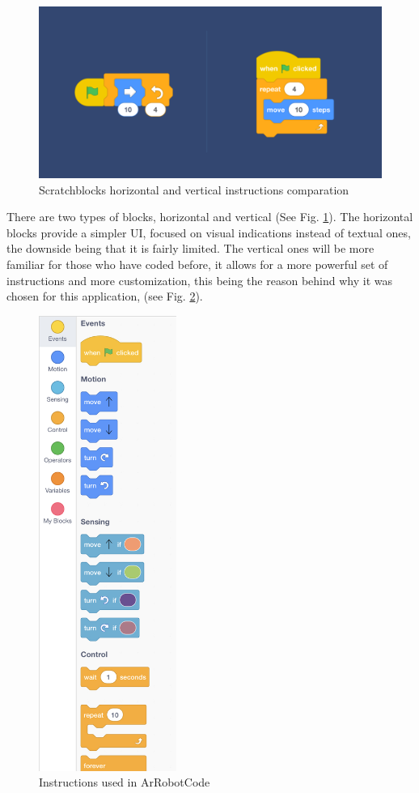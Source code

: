 \documentclass[12 pct]{report}
\begin{document}
\begin{figure}[H]
\includegraphics[width=1.0\textwidth]{scratchblocks}
\centering
\caption{Scratchblocks horizontal and vertical instructions comparation}
\label{fig:scratch-blocks}
\end{figure}

There are two types of blocks, horizontal and vertical (See Fig. \ref{fig:scratch-blocks}). 
The horizontal blocks provide a simpler UI, focused on visual indications instead of textual ones, the downside being that it is fairly limited. 
The vertical ones will be more familiar for those who have coded before, it allows for a more powerful set of instructions and more customization, this being the reason behind why it was chosen for this application, (see Fig. \ref{fig:customInstructions}).

\begin{figure}[H]
\includegraphics[width=0.4\textwidth]{allInstructions}
\centering
\caption{Instructions used in ArRobotCode}
\label{fig:customInstructions}
\end{figure}
\end{document}
